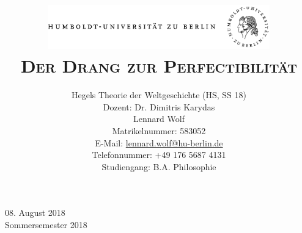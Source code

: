 \documentclass[a4paper, 12pt]{article}
\date{\vspace{-3ex}}
\begin{document}
\title{\vspace{5ex}
	\includegraphics*[bb=0 0 720 200, width=0.72\textwidth]{ErstesSem/images/hu_logo.png}\\
	\vspace{30pt}
	\scshape\LARGE{Der Drang zur Perfectibilität}\\\vspace{20pt}}
	


\author{Hegels Theorie der Weltgeschichte (HS, SS 18)\\
	\vspace{7pt}
          Dozent: Dr. Dimitris Karydas\\\vspace{4pt}Lennard Wolf\\
        \small{Matrikelnummer: 583052}\\
        \small{E-Mail: \href{mailto:lennard.wolf@hu-berlin.de}{lennard.wolf@hu-berlin.de}}\\
        \small{Telefonnummer: +49 176 5687 4131}\\
        \small{Studiengang: B.A. Philosophie}}

\maketitle

\vspace{\fill}

\begin{minipage}[]{0.92\textwidth}
    \centering
    \onehalfspacing
    \large   
    08. August 2018\\
    Sommersemester 2018

    \vspace{-20mm} 
\end{minipage}%
\thispagestyle{empty}
\newpage
\setcounter{page}{1}
\end{document}

